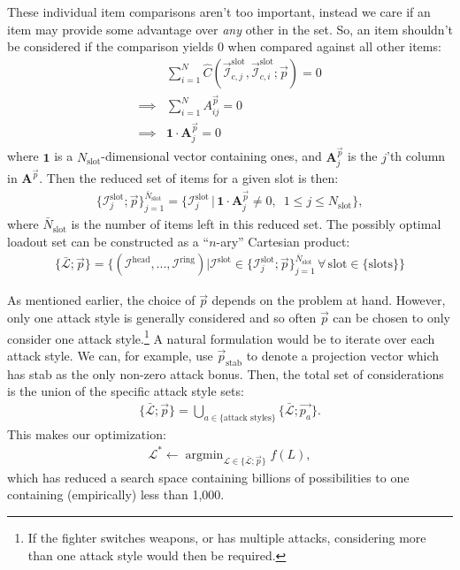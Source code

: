 	These individual item comparisons aren't too important, instead we care if an item may provide some advantage over \emph{any} other in the set. So, an item shouldn't be considered if the comparison yields 0 when compared against all other items:
	\begin{align}
	    &\sum_{i=1}^N \hat C (\vec{\mathcal{I}}_{c, j}^\text{slot}, \vec{\mathcal{I}}_{c, i}^\text{slot}; \vec{p}) = 0\\
	    \implies&\sum_{i=1}^N A_{ij}^{\vec{p}} = 0\\
	    \implies&\boldsymbol{1}\cdot\boldsymbol{A}_j^{\vec{p}} = 0
	\end{align}
	where $\boldsymbol{1}$ is a $N_\text{slot}$-dimensional vector containing ones, and $\boldsymbol{A}_j^{\vec{p}}$ is the $j$'th column in $\boldsymbol{A}^{\vec{p}}$.
	Then the reduced set of items for a given slot is then:
	\begin{align}
	    \{\mathcal{I}^\text{slot}_j; \vec{p}\}_{j=1}^{\bar{N}_\text{slot}} = \{\mathcal{I}_j^\text{slot}\,|\,\boldsymbol{1}\cdot\boldsymbol{A}_j^{\vec{p}} \neq 0,\,\,\, 1 \leq j \leq N_\text{slot}\},
	\end{align}
	where $\bar{N}_\text{slot}$ is the number of items left in this reduced set. The possibly optimal loadout set can be constructed as a ``$n$-ary'' Cartesian product:
	\begin{align}
		\{\bar{\mathcal{L}}; \vec{p}\} = \{(\mathcal{I}^\text{head}, ..., \mathcal{I}^\text{ring}) | \mathcal{I}^\text{slot} \in \{\mathcal{I}^\text{slot}_j; \vec{p}\}_{j=1}^{\bar{N}_\text{slot}} \,\forall\, \text{slot} \in \{\text{slots}\}\}
	\end{align}

	As mentioned earlier, the choice of $\vec p$ depends on the problem at hand. However, only one attack style is generally considered and so often $\vec p$ can be chosen to only consider one attack style.\footnote{If the fighter switches weapons, or has multiple attacks, considering more than one attack style would then be required.} A natural formulation would be to iterate over each attack style. We can, for example, use $\vec{p}_\text{stab}$ to denote a projection vector which has stab as the only non-zero attack bonus. Then, the total set of considerations is the union of the specific attack style sets:
	\begin{align}
	    \{\bar{\mathcal{L}}; \vec{p}\} = \bigcup_{a\in \{\text{attack styles}\}}  \{\bar{\mathcal{L}}; \vec{p_a}\}.
	\end{align}
	This makes our optimization:
	\begin{align}
		\mathcal{L}^* \leftarrow \mathop{\mathrm{argmin}}_{\mathcal{L} \in \{\bar{\mathcal{L}}; \vec{p}\}} f(L),
	\end{align}
	which has reduced a search space containing billions of possibilities to one containing (empirically) less than 1,000.


